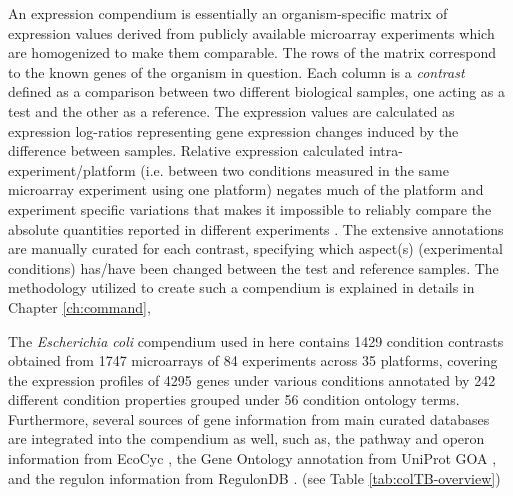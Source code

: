 An expression compendium is essentially an organism-specific matrix of
expression values derived from publicly available microarray experiments which
are homogenized to make them comparable. The rows of the matrix correspond to
the known genes of the organism in question.
%
Each column is a \textit{contrast} defined as a comparison between two different
biological samples, one acting as a test and the other as a reference.
%
The expression values are calculated as expression log-ratios representing gene
expression changes induced by the difference between samples.
%
Relative expression calculated intra-experiment/platform (i.e. between two
conditions measured in the same microarray experiment using one platform)
negates much of the platform and experiment specific variations that makes it
impossible to reliably compare the absolute quantities reported in different
experiments \cite{Shi2006}.
%
The extensive annotations are manually curated for each contrast, specifying
which aspect(s) (experimental conditions) has/have been changed between the test
and reference samples.
%
The methodology utilized to create such a compendium is explained in details in
Chapter \ref{ch:command},




The \textit{Escherichia coli} compendium used in here contains 1429 condition
contrasts obtained from 1747 microarrays of 84 experiments across 35 platforms,
covering the expression profiles of 4295 genes under various conditions
annotated by 242 different condition properties grouped under 56 condition
ontology terms.
%
Furthermore, several sources of gene information from main curated databases are
integrated into the compendium as well, such as, the pathway and operon
information from EcoCyc \cite{Keseler2009}, the Gene Ontology annotation from
UniProt GOA \cite{Camon2004}, and the regulon information from RegulonDB
\cite{Gama-Castro2008}. (see Table \ref{tab:colTB-overview})

